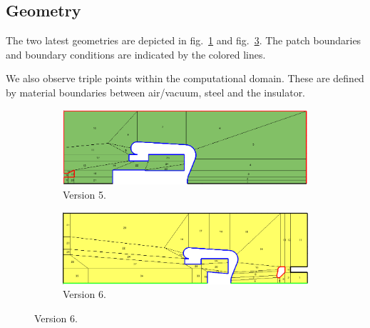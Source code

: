 \subsection{Geometry}
The two latest geometries are depicted in fig.~\ref{fig:geometry_v5} and fig.~\ref{fig:geometry_v6}. The patch boundaries and boundary conditions are indicated by the colored lines.

We also observe triple points within the computational domain. These are defined by material boundaries between air/vacuum, steel and the insulator.

\begin{center}
\begin{figure}[H]
   \begin{subfigure}{0.45\textwidth}
      \includegraphics[width=\textwidth]{fig/geometry_v5}
      \caption{Version 5.}
      \label{fig:geometry_v5}
   \end{subfigure}
   \begin{subfigure}{0.45\textwidth}
      \includegraphics[width=\textwidth]{fig/geometry_v6}
      \caption{Version 6.}
      \label{fig:geometry_v6}
   \end{subfigure}
\end{figure}
\end{center}

%       
%
%       

